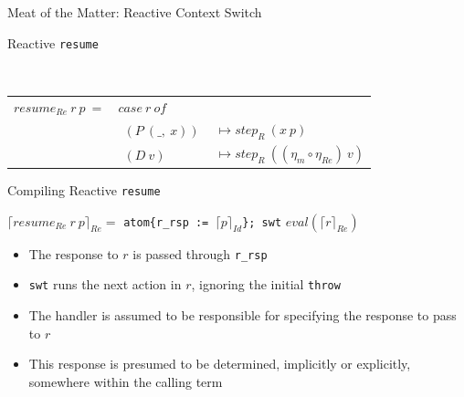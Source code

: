 \documentclass{beamer}
\begin{document}
\begin{frame}{Meat of the Matter: Reactive Context Switch}

\begin{structure}{Reactive \texttt{resume}}

\begin{onlinebox}{10cm}

\\

\begin{tabular}[t]{lll}
$resume_{Re}\ r\ p\ = $&$case\ r\ of$\\
&$\ \ (P\ (\_,\ x))\ $&$\mapsto step_R\ (x\ p)$\\
&$\ \ (D\ v)\ $&$\mapsto step_R\ ((\eta_m \circ \eta_{Re})\ v)$\\

\end{tabular}

\end{onlinebox}
\end{structure}

\medskip

\begin{structure}{Compiling Reactive \texttt{resume}}

\begin{onlinebox}{11cm}

$\lceil resume_{Re}\ r\ p\rceil_{Re} =$ \texttt{atom\{r\_rsp := $\lceil p \rceil_{Id}$\}; swt} $eval(\lceil r \rceil_{Re})$\\

\end{onlinebox}

\end{structure}

\begin{itemize}

\item{The response to $r$ is passed through \texttt{r\_rsp}}

\item{\texttt{swt} runs the next action in $r$, ignoring the initial \texttt{throw}}

\item{The handler is assumed to be responsible for specifying the response to pass to $r$}

\item{This response is presumed to be determined, implicitly or explicitly, somewhere within the calling term}


\end{itemize}

\end{frame}
\end{document}
